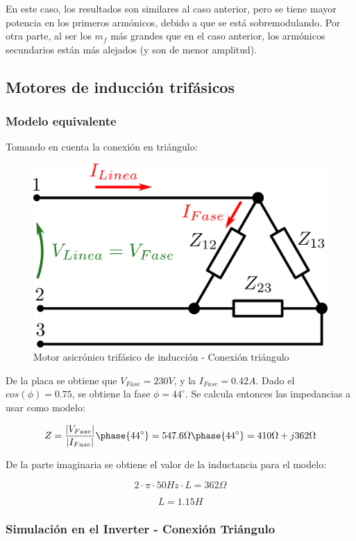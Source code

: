 \documentclass[e4_tp3_main.tex]{subfiles}
\begin{document}
En este caso, los resultados son similares al caso anterior, pero se tiene mayor potencia en los primeros armónicos, debido a que se está sobremodulando. Por otra parte, al ser los $m_f$ más grandes que en el caso anterior, los armónicos secundarios están más alejados (y son de menor amplitud). 

\subsection{Motores de inducción trifásicos}

\subsubsection{Modelo equivalente}

Tomando en cuenta la conexión en triángulo:

\begin{figure}[H]
\centering
\includegraphics[width=0.6\linewidth]{Imagenes/motorParte2.png}
\caption{Motor asicrónico trifásico de inducción - Conexión triángulo}
\end{figure}

De la placa se obtiene que $V_{Fase} = 230V$, y la $I_{Fase} = 0.42A$. Dado el $cos(\phi) = 0.75$, se obtiene la fase $\phi = 44^{\circ}$. Se calcula entonces las impedancias a usar como modelo:

\[
Z = \frac{|V_{Fase}|}{|I_{Fase}|} \phase{44^{\circ}} = 547.6\Omega \phase{44^{\circ}} = 410 \Omega + j362 \Omega
\]  

De la parte imaginaria se obtiene el valor de la inductancia para el modelo:

\[
2 \cdot \pi \cdot 50Hz \cdot L = 362\Omega
\]

\[
L = 1.15H
\]

\subsubsection{Simulación en el Inverter - Conexión Triángulo}
\end{document}
